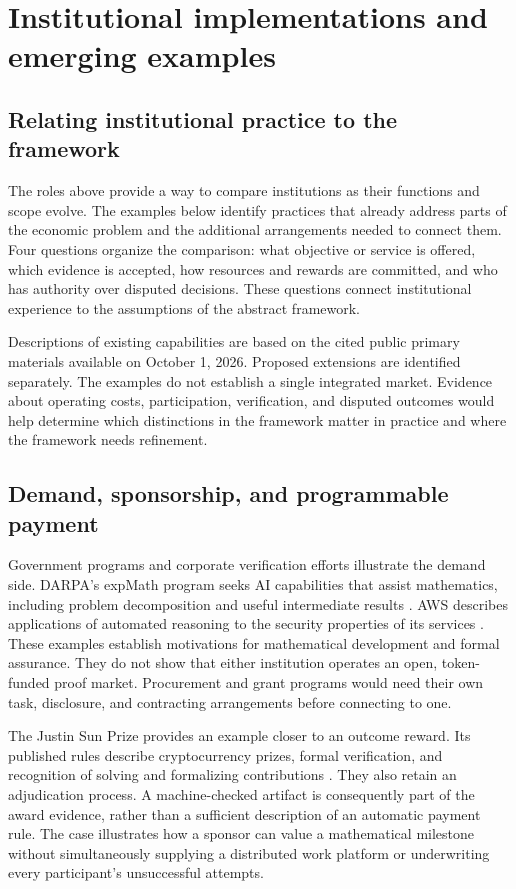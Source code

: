 \documentclass[11pt,a4paper]{article}
\begin{document}
\section{Institutional implementations and emerging examples}
\label{sec:implementations}
\subsection{Relating institutional practice to the framework}
The roles above provide a way to compare institutions as their functions and scope evolve. The examples below identify practices that already address parts of the economic problem and the additional arrangements needed to connect them. Four questions organize the comparison: what objective or service is offered, which evidence is accepted, how resources and rewards are committed, and who has authority over disputed decisions. These questions connect institutional experience to the assumptions of the abstract framework.

Descriptions of existing capabilities are based on the cited public primary materials available on October 1, 2026. Proposed extensions are identified separately. The examples do not establish a single integrated market. Evidence about operating costs, participation, verification, and disputed outcomes would help determine which distinctions in the framework matter in practice and where the framework needs refinement.

\subsection{Demand, sponsorship, and programmable payment}
Government programs and corporate verification efforts illustrate the demand side. DARPA's expMath program seeks AI capabilities that assist mathematics, including problem decomposition and useful intermediate results \citep{darpa}. AWS describes applications of automated reasoning to the security properties of its services \citep{aws}. These examples establish motivations for mathematical development and formal assurance. They do not show that either institution operates an open, token-funded proof market. Procurement and grant programs would need their own task, disclosure, and contracting arrangements before connecting to one.

The Justin Sun Prize provides an example closer to an outcome reward. Its published rules describe cryptocurrency prizes, formal verification, and recognition of solving and formalizing contributions \citep{sun}. They also retain an adjudication process. A machine-checked artifact is consequently part of the award evidence, rather than a sufficient description of an automatic payment rule. The case illustrates how a sponsor can value a mathematical milestone without simultaneously supplying a distributed work platform or underwriting every participant's unsuccessful attempts.
\end{document}
